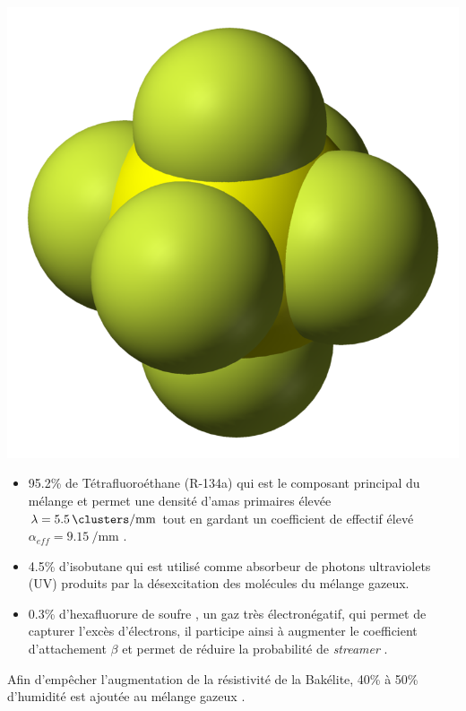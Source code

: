 \marginpar
{
	\centering
	\includegraphics[width=\marginparwidth]{RPC/Sulfurhexafluoride.png}
	\label{hexa}
}

\begin{itemize}[label=$\bullet$]
\item \num{95.2}\% de Tétrafluoroéthane  (R-134a) qui est le composant principal du mélange et permet une densité d'amas primaires élevée $\lambda=\SI{5.5}{\clusters\per\milli\meter}$ tout en gardant un coefficient de  effectif élevé $\alpha_{eff}=\SI{9.15}{\per\milli\meter}$ \cite{CMS-NOTE-1997-004}.
\item \num{4.5}\% d'isobutane  qui est utilisé comme absorbeur de photons ultraviolets (UV) produits par la désexcitation des molécules du mélange gazeux.
\item \num{0.3}\% d'hexafluorure de soufre , un gaz très électronégatif, qui permet de capturer l'excès d'électrons, il participe ainsi à augmenter le coefficient d'attachement $\beta$ et permet de réduire la probabilité de \textit{streamer} \cite{Camarri:685607}.
\end{itemize}

Afin d'empêcher l'augmentation de la résistivité de la Bakélite, \num{40}\% à \num{50}\% d'humidité est ajoutée au mélange gazeux \cite{Abbrescia:2004fv}.

